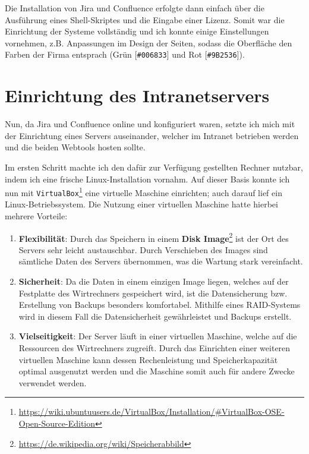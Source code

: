\documentclass[xcolor=dvipsnames,11pt,paper=a4paper]{report}
\begin{document}
Die Installation von Jira und Confluence erfolgte dann einfach über die Ausführung
eines Shell-Skriptes und die Eingabe einer Lizenz. Somit war die Einrichtung der
Systeme vollständig und ich konnte einige Einstellungen vornehmen, z.B. Anpassungen
im Design der Seiten, sodass die Oberfläche den Farben der Firma entsprach
(\textcolor[HTML]{006833}{Grün [\texttt{\#006833}]} und \textcolor[HTML]{9B2536}{Rot [\texttt{\#9B2536}]}).



\section{Einrichtung des Intranetservers}
\label{sec:jira-server}

Nun, da Jira und Confluence online und konfiguriert waren, setzte ich mich mit der
Einrichtung eines Servers auseinander, welcher im Intranet betrieben werden und
die beiden Webtools hosten sollte.

Im ersten Schritt machte ich den dafür zur Verfügung gestellten Rechner nutzbar,
indem ich eine frische Linux-Installation vornahm. Auf dieser Basis konnte ich nun
mit \texttt{VirtualBox}\footnote{\url{https://wiki.ubuntuusers.de/VirtualBox/Installation/\#VirtualBox-OSE-Open-Source-Edition}}
eine virtuelle Maschine einrichten; auch darauf lief ein Linux-Betriebssystem. Die
Nutzung einer virtuellen Maschine hatte hierbei mehrere Vorteile:
\begin{enumerate}
	\item \textbf{Flexibilität}:
	Durch das Speichern in einem \textbf{Disk Image}\footnote{\url{https://de.wikipedia.org/wiki/Speicherabbild}} ist der Ort des Servers
	sehr leicht austauschbar. Durch Verschieben des Images sind sämtliche Daten des
	Servers übernommen, was die Wartung stark vereinfacht.
	\item \textbf{Sicherheit}:
	Da die Daten in einem einzigen Image liegen, welches auf der Festplatte des
	Wirtrechners gespeichert wird, ist die Datensicherung bzw. Erstellung von Backups
	besonders komfortabel. Mithilfe eines RAID-Systems wird in diesem Fall die Datensicherheit
	gewährleistet und Backups erstellt.
	\item \textbf{Vielseitigkeit}:
	Der Server läuft in einer virtuellen Maschine, welche auf die Ressourcen
	des Wirtrechners zugreift. Durch das Einrichten einer weiteren virtuellen Maschine
	kann dessen Rechenleistung und Speicherkapazität optimal ausgenutzt werden und
	die Maschine somit auch für andere Zwecke verwendet werden.
\end{enumerate}
\end{document}
